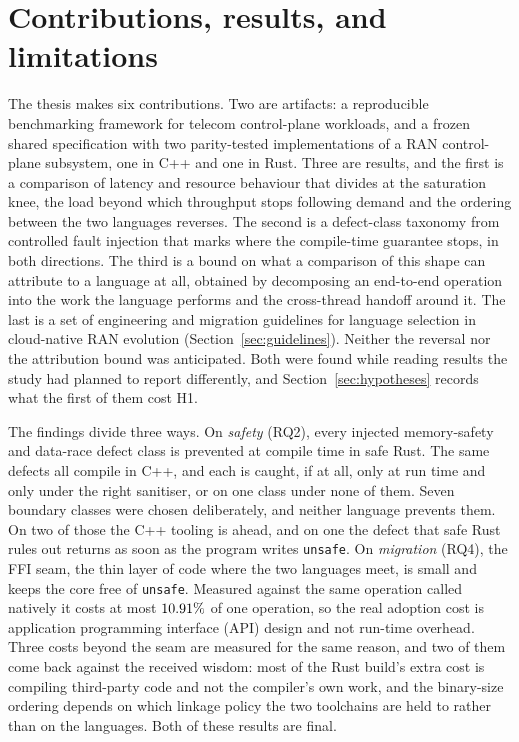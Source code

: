 \documentclass[english,oneside,a4paper,censored,csm,software-track-2020]{HYthesisML}
\begin{document}
\section{Contributions, results, and limitations}
The thesis makes six contributions. Two are artifacts: a reproducible benchmarking framework
for telecom control-plane workloads, and a frozen shared specification with two parity-tested
implementations of a RAN control-plane subsystem, one in C++ and one in Rust. Three are
results, and the first is a comparison of latency and resource behaviour that divides at
the saturation knee, the load beyond which throughput stops following demand and the
ordering between the two languages reverses. The second is a
defect-class taxonomy from controlled fault injection that marks where the compile-time
guarantee stops, in both directions. The third is a bound on what a comparison of this shape can
attribute to a language at all, obtained by decomposing an end-to-end operation into the work the
language performs and the cross-thread handoff around it. The last is a set of engineering and
migration guidelines for language selection in cloud-native RAN evolution
(Section~\ref{sec:guidelines}). Neither the reversal nor the attribution bound was anticipated.
Both were found while reading results the study had planned to report differently, and
Section~\ref{sec:hypotheses} records what the first of them cost H1.

The findings divide three ways. On \emph{safety} (RQ2), every injected memory-safety and
data-race defect class is prevented at compile time in safe Rust. The same defects all compile
in C++, and each is caught, if at all, only at run time and only under the right sanitiser, or on
one class under none of them. Seven
boundary classes were chosen deliberately, and neither language prevents them. On two of those
the C++ tooling is ahead, and on one the defect that safe Rust rules out returns as soon as the
program writes \texttt{unsafe}. On \emph{migration} (RQ4), the FFI seam, the thin layer of code
where the two languages meet, is small and keeps the core free of \texttt{unsafe}. Measured
against the same operation called natively it costs at most $10.91\%$ of one
operation, so the real adoption cost is application programming
interface (API) design and not run-time
overhead. Three costs beyond the seam are measured for the same reason, and two of them come back
against the received wisdom: most of the Rust build's extra cost is compiling third-party code and
not the compiler's own work, and the binary-size ordering depends on which linkage policy the two
toolchains are held to rather than on the languages. Both of these results are final.
\end{document}
